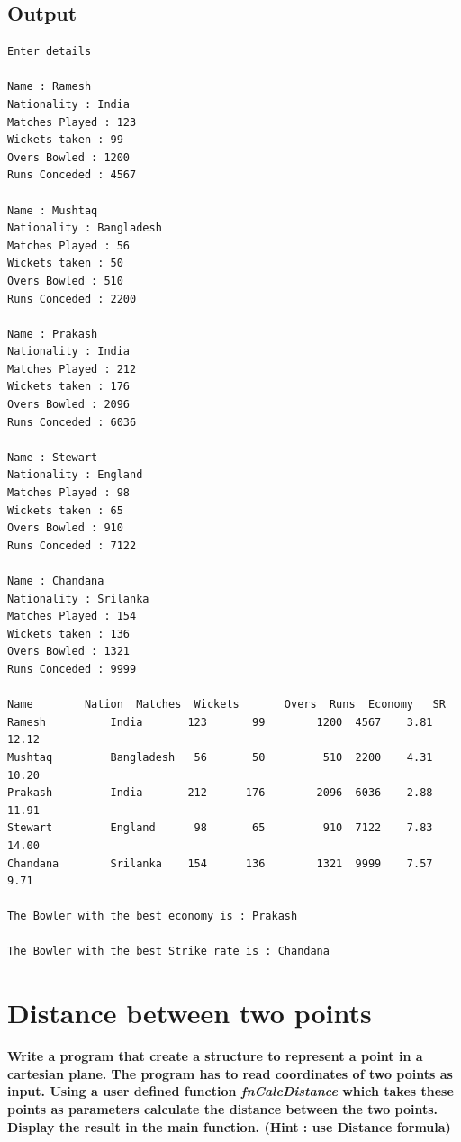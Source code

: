 \documentclass[a4paper]{report}
\begin{document}
\section*{Output}
\begin{Verbatim}
Enter details

Name : Ramesh      
Nationality : India
Matches Played : 123
Wickets taken : 99
Overs Bowled : 1200
Runs Conceded : 4567

Name : Mushtaq
Nationality : Bangladesh
Matches Played : 56
Wickets taken : 50
Overs Bowled : 510
Runs Conceded : 2200

Name : Prakash
Nationality : India
Matches Played : 212
Wickets taken : 176
Overs Bowled : 2096
Runs Conceded : 6036

Name : Stewart
Nationality : England
Matches Played : 98
Wickets taken : 65
Overs Bowled : 910
Runs Conceded : 7122

Name : Chandana
Nationality : Srilanka
Matches Played : 154
Wickets taken : 136
Overs Bowled : 1321
Runs Conceded : 9999

Name	    Nation	Matches  Wickets       Overs  Runs  Economy   SR
Ramesh          India     	123       99        1200  4567    3.81   12.12
Mushtaq         Bangladesh	 56       50         510  2200    4.31   10.20
Prakash         India     	212      176        2096  6036    2.88   11.91
Stewart         England   	 98       65         910  7122    7.83   14.00
Chandana        Srilanka  	154      136        1321  9999    7.57    9.71

The Bowler with the best economy is : Prakash

The Bowler with the best Strike rate is : Chandana

\end{Verbatim}

\chapter{Distance between two points}
{\selectfont \textbf{Write a program that create a structure to represent a point in a cartesian plane. The program has to read coordinates of two points as input. Using a user defined function \textit{fnCalcDistance} which takes these points as parameters calculate the distance between the two points. Display the result in the main function. (Hint : use Distance formula)
}}
\end{document}
